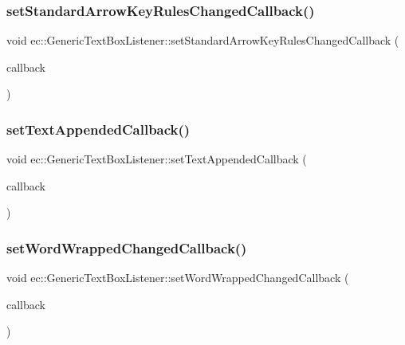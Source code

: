 \subsubsection{\texorpdfstring{set\+Standard\+Arrow\+Key\+Rules\+Changed\+Callback()}{setStandardArrowKeyRulesChangedCallback()}}
{\footnotesize\ttfamily void ec\+::\+Generic\+Text\+Box\+Listener\+::set\+Standard\+Arrow\+Key\+Rules\+Changed\+Callback (\begin{DoxyParamCaption}\item[{const \mbox{\hyperlink{classec_1_1_generic_text_box_listener_a1099a678278dd6c888d0ba18af73979b}{Standard\+Arrow\+Key\+Rules\+Changed\+\_\+\+Callback}} \&}]{callback }\end{DoxyParamCaption})}

\mbox{\label{classec_1_1_generic_text_box_listener_a644d32f4ecdf11da00bcd9f509de5f7d}} 
\subsubsection{\texorpdfstring{set\+Text\+Appended\+Callback()}{setTextAppendedCallback()}}
{\footnotesize\ttfamily void ec\+::\+Generic\+Text\+Box\+Listener\+::set\+Text\+Appended\+Callback (\begin{DoxyParamCaption}\item[{const \mbox{\hyperlink{classec_1_1_generic_text_box_listener_a7bc50ee05522edf211ca7ce6a86f16c7}{Text\+Appended\+\_\+\+Callback}} \&}]{callback }\end{DoxyParamCaption})}

\mbox{\label{classec_1_1_generic_text_box_listener_ac8f1f1c007e002ad7677e291e44d33dd}} 
\subsubsection{\texorpdfstring{set\+Word\+Wrapped\+Changed\+Callback()}{setWordWrappedChangedCallback()}}
{\footnotesize\ttfamily void ec\+::\+Generic\+Text\+Box\+Listener\+::set\+Word\+Wrapped\+Changed\+Callback (\begin{DoxyParamCaption}\item[{const \mbox{\hyperlink{classec_1_1_generic_text_box_listener_aa94d95c932df4d70fe03c501520f0d16}{Word\+Wrapped\+Changed\+\_\+\+Callback}} \&}]{callback }\end{DoxyParamCaption})}

